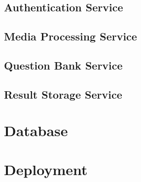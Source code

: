 \documentclass{article}
\begin{document}
\subsection{Authentication Service}
\subsection{Media Processing Service}
\subsection{Question Bank Service}
\subsection{Result Storage Service}

\section{Database}

\section{Deployment}
\end{document}
